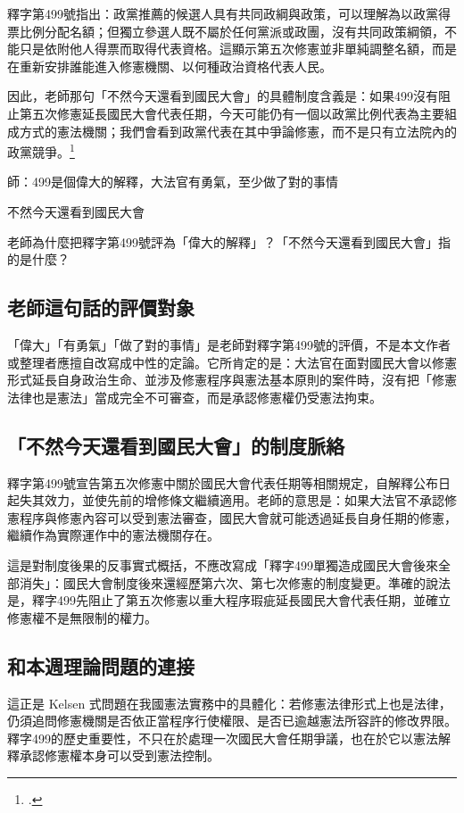 釋字第499號指出：政黨推薦的候選人具有共同政綱與政策，可以理解為以政黨得票比例分配名額；但獨立參選人既不屬於任何黨派或政團，沒有共同政策綱領，不能只是依附他人得票而取得代表資格。這顯示第五次修憲並非單純調整名額，而是在重新安排誰能進入修憲機關、以何種政治資格代表人民。

因此，老師那句「不然今天還看到國民大會」的具體制度含義是：如果499沒有阻止第五次修憲延長國民大會代表任期，今天可能仍有一個以政黨比例代表為主要組成方式的憲法機關；我們會看到政黨代表在其中爭論修憲，而不是只有立法院內的政黨競爭。\footcites{gazette6297}{jy499}


\begin{qaprompt}
師：499是個偉大的解釋，大法官有勇氣，至少做了對的事情

不然今天還看到國民大會
\end{qaprompt}

\begin{qaquestion}
老師為什麼把釋字第499號評為「偉大的解釋」？「不然今天還看到國民大會」指的是什麼？
\end{qaquestion}

\subsection{老師這句話的評價對象}

「偉大」「有勇氣」「做了對的事情」是老師對釋字第499號的評價，不是本文作者或整理者應擅自改寫成中性的定論。它所肯定的是：大法官在面對國民大會以修憲形式延長自身政治生命、並涉及修憲程序與憲法基本原則的案件時，沒有把「修憲法律也是憲法」當成完全不可審查，而是承認修憲權仍受憲法拘束。

\subsection{「不然今天還看到國民大會」的制度脈絡}

釋字第499號宣告第五次修憲中關於國民大會代表任期等相關規定，自解釋公布日起失其效力，並使先前的增修條文繼續適用。老師的意思是：如果大法官不承認修憲程序與修憲內容可以受到憲法審查，國民大會就可能透過延長自身任期的修憲，繼續作為實際運作中的憲法機關存在。

這是對制度後果的反事實式概括，不應改寫成「釋字499單獨造成國民大會後來全部消失」：國民大會制度後來還經歷第六次、第七次修憲的制度變更。準確的說法是，釋字499先阻止了第五次修憲以重大程序瑕疵延長國民大會代表任期，並確立修憲權不是無限制的權力。

\subsection{和本週理論問題的連接}

這正是 Kelsen 式問題在我國憲法實務中的具體化：若修憲法律形式上也是法律，仍須追問修憲機關是否依正當程序行使權限、是否已逾越憲法所容許的修改界限。釋字499的歷史重要性，不只在於處理一次國民大會任期爭議，也在於它以憲法解釋承認修憲權本身可以受到憲法控制。
